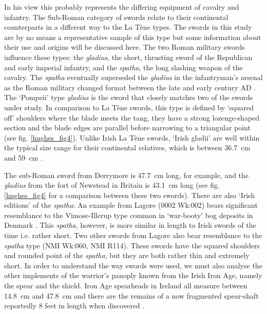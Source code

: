 In his view this probably represents the differing equipment of cavalry and infantry.
The Sub-Roman category of swords relate to their continental counterparts in a different way to the La Tène types. 
The swords in this study are by no means a representative sample of this type but some information about their use and origins will be discussed here. 
The two Roman military swords influence these types: the \emph{gladius}, the short, thrusting sword of the Republican and early imperial infantry, and the \emph{spatha}, the long slashing weapon of the cavalry. 
The \emph{spatha} eventually superseded the \emph{gladius} in the infantryman’s arsenal as the Roman military changed format between the late and early  century AD \parencites[61]{Stephenson1999}[212\psq]{Southern2007}.
The ‘Pompeii’ type \emph{gladius} is the sword that closely matches two of the swords under study. 
In comparison to La Tène swords, this type is defined by ‘squared off’ shoulders where the blade meets the tang, they have a strong lozenge-shaped section and the blade edges are parallel before narrowing to a triangular point (see fig. \ref{hughes_fig4}). 
Unlike Irish La Tène swords, ‘Irish gladii’ are well within the typical size range for their continental relatives, which is between \SI{36.7}{\cm} and \SI{59}{\cm} \parencites[200]{Lang1988}[37]{Coulston2007}. 

The sub-Roman sword from Derrymore is \SI{47.7}{\cm} long, for example, 
and the \emph{gladius} from the fort of Newstead in Britain is \SI{43.1}{\cm} long (see fig. \ref{hughes_fig4} for a comparison between these two swords). 
There are also ‘Irish editions’ of the \emph{spatha}: An example from Lagore (0002 Wk:002) bears significant resemblance to the Vimose-Illerup type common in ‘war-booty’ bog deposits in Denmark 
\parencites[28]{CahillWilson2014}[for more information on Danish bog deposits see][]{Pauli-Jensen2009}. 
This \emph{spatha}, however, is more similar in length to Irish swords of the time i.e. rather short. 
Two other swords from Lagore also bear resemblance to the \emph{spatha} type (NMI Wk:060, NMI R114). 
These swords have the squared shoulders and rounded point of the \emph{spatha}, but they are both rather thin and extremely short. 
In order to understand the way swords were used, we must also analyse the other implements of the warrior’s panoply known from the Irish Iron Age, namely the spear and the shield. Iron Age spearheads in Ireland all measure between \SI{14.8}{\cm} and \SI{47.8}{\cm} and there are the remains of a now fragmented spear-shaft reportedly 8 feet in length when discovered \parencite[109--111]{Raftery1983}. 

